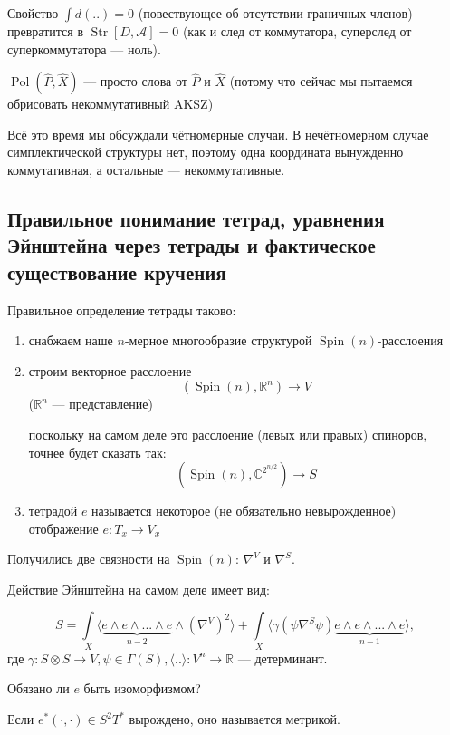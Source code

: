 \documentclass[11pt]{article}
\theoremstyle{remark}
\theoremstyle{definition}
\begin{document}
Свойство $\int d(..) = 0$ (повествующее об отсутствии граничных членов) превратится в $\operatorname{Str} [D, \mathcal{A}] = 0$ (как и след от коммутатора, суперслед от суперкоммутатора --- ноль).

$\operatorname{Pol} (\hat P, \hat X)$ --- просто слова от $\hat P$ и $\hat X$ (потому что сейчас мы пытаемся обрисовать некоммутативный AKSZ)

Всё это время мы обсуждали чётномерные случаи. В нечётномерном случае симплектической структуры нет, поэтому одна координата вынужденно коммутативная, а остальные --- некоммутативные.

\subsection{Правильное понимание тетрад, уравнения Эйнштейна через тетрады и фактическое существование кручения}

Правильное определение тетрады таково:

\begin{enumerate}
\item снабжаем наше $n$-мерное многообразие структурой $\operatorname{Spin}(n)$-расслоения
\item строим векторное расслоение $$(\operatorname{Spin}(n), \mathbb{R}^n) \to V$$ ($\mathbb{R}^n$ --- представление)

поскольку на самом деле это расслоение (левых или правых) спиноров, точнее будет сказать так:
$$(\operatorname{Spin}(n), \mathbb{C}^{2^{n/2}}) \to S$$

\item тетрадой $e$ называется некоторое (не обязательно невырожденное) отображение $e: T_x \to V_x$
\end{enumerate}

Получились две связности на $\operatorname{Spin}(n)$: $\nabla^V$ и $\nabla^S$.

Действие Эйнштейна на самом деле имеет вид:

$$S = \int\limits_X \langle \underbrace{e \wedge e \wedge ... \wedge e}_{n-2} \wedge (\nabla^V)^2 \rangle + \int\limits_X \langle \gamma(\psi \nabla^S \psi) \underbrace{e \wedge e \wedge ... \wedge e}_{n-1}  \rangle, $$ где $\gamma: S\otimes S \to V, \psi\in \Gamma(S), \langle .. \rangle: V^n \to \mathbb{R}$ --- детерминант.

Обязано ли $e$ быть изоморфизмом?

Если $e^* (\cdot,\cdot) \in S^2 T^*$ вырождено, оно называется метрикой.
\end{document}
